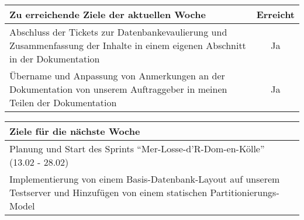 \begin{tabularx}{\textwidth}{Xc}
    \arrayrulecolor{OliveGreen}
    \toprule
    {\bfseries Zu erreichende Ziele der aktuellen Woche} & {\bfseries Erreicht} \\
    \midrule[2pt]
    Abschluss der Tickets zur Datenbankevaulierung und Zusammenfassung der
    Inhalte in einem eigenen Abschnitt in der Dokumentation  &  Ja  \\
    \rowcolor{OliveGreen!15}
    Übername und Anpassung von Anmerkungen an der Dokumentation von unserem
    Auftraggeber in meinen Teilen der Dokumentation  &  Ja  \\
    \bottomrule[2pt]
\end{tabularx}
%
\vspace{1cm}
%
\begin{tabularx}{\textwidth}{Xc}
    \arrayrulecolor{OliveGreen}
    \toprule
    {\bfseries Ziele für die nächste Woche}              &                   \\
    \midrule[2pt]
    Planung und Start des Sprints ``Mer-Losse-d'R-Dom-en-Kölle''
    (13.02 - 28.02)  &  \\
    \rowcolor{OliveGreen!15}
    Implementierung von einem Basis-Datenbank-Layout auf unserem Testserver
    und Hinzufügen von einem statischen Partitionierungs-Model  &  \\
\end{tabularx}

